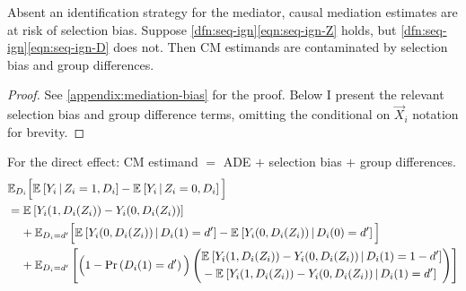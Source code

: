 \begin{theorem}
    \label{thm:selection-bias}
    Absent an identification strategy for the mediator, causal mediation estimates are at risk of selection bias.
    Suppose \ref{dfn:seq-ign}\eqref{eqn:seq-ign-Z} holds, but \ref{dfn:seq-ign}\eqref{eqn:seq-ign-D} does not.
    Then CM estimands are contaminated by selection bias and group differences.
\end{theorem}
\begin{proof}
    See \autoref{appendix:mediation-bias} for the proof.
    Below I present the relevant selection bias and group difference terms, omitting the conditional on $\vec X_i$ notation for brevity.
\end{proof}

\noindent
For the direct effect: CM estimand $=$ ADE $+$ selection bias $+$ group differences.
\begin{align*}
    & \mathbb E_{D_i} \Big[
        \Egiven{Y_i}{Z_i = 1, D_i} - \Egiven{Y_i}{Z_i = 0, D_i} \Big] \\
    & = \E{Y_i(1, D_i(Z_i)) - Y_i(0, D_i(Z_i))} \\
    & \;\;\;\; + \mathbb E_{D_i = d'} \Big[
        \Egiven{Y_i(0, D_i(Z_i))}{D_i(1) = d'} 
        - \Egiven{Y_i(0, D_i(Z_i))}{D_i(0) = d'} \Big] \\
    & \;\;\;\; + \E[D_i = d']{
        \Big(1 - \Prob{D_i(1) = d'} \Big)
        \left( \begin{aligned}
            &\Egiven{Y_i(1, D_i(Z_i)) - Y_i(0, D_i(Z_i))}{D_i(1) = 1-d'} \\ 
            &  - \Egiven{Y_i(1, D_i(Z_i)) - Y_i(0, D_i(Z_i))}{D_i(1) = d'}
            \end{aligned} \right) }
\end{align*}

